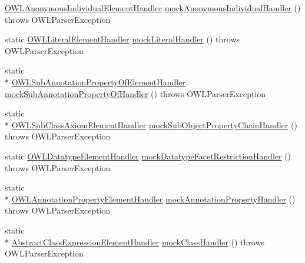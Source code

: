 \begin{DoxyCompactItemize}
\hyperlink{classorg_1_1coode_1_1owlapi_1_1owlxmlparser_1_1_o_w_l_anonymous_individual_element_handler}{O\-W\-L\-Anonymous\-Individual\-Element\-Handler} \hyperlink{classorg_1_1semanticweb_1_1owlapi_1_1contract_1_1_utils_a6f4a38e9c398cc042eb2c42214ce02de}{mock\-Anonymous\-Individual\-Handler} ()  throws O\-W\-L\-Parser\-Exception 
\item 
static \hyperlink{classorg_1_1coode_1_1owlapi_1_1owlxmlparser_1_1_o_w_l_literal_element_handler}{O\-W\-L\-Literal\-Element\-Handler} \hyperlink{classorg_1_1semanticweb_1_1owlapi_1_1contract_1_1_utils_adf9e97854c590ecfbb24c7399e1bf427}{mock\-Literal\-Handler} ()  throws O\-W\-L\-Parser\-Exception 
\item 
static \\*
\hyperlink{classorg_1_1coode_1_1owlapi_1_1owlxmlparser_1_1_o_w_l_sub_annotation_property_of_element_handler}{O\-W\-L\-Sub\-Annotation\-Property\-Of\-Element\-Handler} \hyperlink{classorg_1_1semanticweb_1_1owlapi_1_1contract_1_1_utils_a3baa0f6c97c1e97d43538aabdbc62138}{mock\-Sub\-Annotation\-Property\-Of\-Handler} ()  throws O\-W\-L\-Parser\-Exception 
\item 
static \\*
\hyperlink{classorg_1_1coode_1_1owlapi_1_1owlxmlparser_1_1_o_w_l_sub_class_axiom_element_handler}{O\-W\-L\-Sub\-Class\-Axiom\-Element\-Handler} \hyperlink{classorg_1_1semanticweb_1_1owlapi_1_1contract_1_1_utils_a2f170674ba4cebf88a2c08e68d872823}{mock\-Sub\-Object\-Property\-Chain\-Handler} ()  throws O\-W\-L\-Parser\-Exception 
\item 
static \hyperlink{classorg_1_1coode_1_1owlapi_1_1owlxmlparser_1_1_o_w_l_datatype_element_handler}{O\-W\-L\-Datatype\-Element\-Handler} \hyperlink{classorg_1_1semanticweb_1_1owlapi_1_1contract_1_1_utils_a8fbcd8b3de3a9a753b1e53f4ae2756f2}{mock\-Datatype\-Facet\-Restriction\-Handler} ()  throws O\-W\-L\-Parser\-Exception 
\item 
static \\*
\hyperlink{classorg_1_1coode_1_1owlapi_1_1owlxmlparser_1_1_o_w_l_annotation_property_element_handler}{O\-W\-L\-Annotation\-Property\-Element\-Handler} \hyperlink{classorg_1_1semanticweb_1_1owlapi_1_1contract_1_1_utils_a9d9453d27c9a1589109bc8c4bf1e58db}{mock\-Annotation\-Property\-Handler} ()  throws O\-W\-L\-Parser\-Exception 
\item 
static \\*
\hyperlink{classorg_1_1coode_1_1owlapi_1_1owlxmlparser_1_1_abstract_class_expression_element_handler}{Abstract\-Class\-Expression\-Element\-Handler} \hyperlink{classorg_1_1semanticweb_1_1owlapi_1_1contract_1_1_utils_ab529fdf760c525b989caa663588d11a9}{mock\-Class\-Handler} ()  throws O\-W\-L\-Parser\-Exception 

\end{DoxyCompactItemize}
